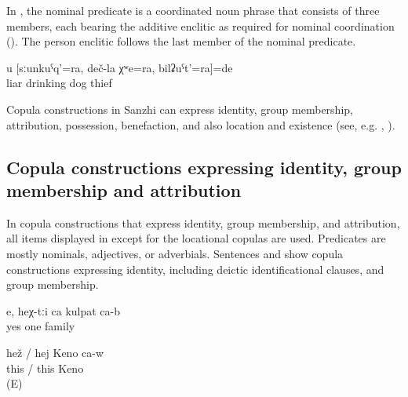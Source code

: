 In , the nominal predicate is a coordinated noun phrase that consists of three members, each bearing the additive enclitic as required for nominal coordination (). The person enclitic follows the last member of the nominal predicate.
%
\begin{exe}
	\ex	\label{ex:You are a liar, a drinking dog, and a thief}
	\gll	u	[sːunkuˁq'=ra,	deč-la	χʷe=ra,	bilʡuˁt'=ra]=de\\
			liar	drinking	dog	thief\\
	\glt	{}
\end{exe}

Copula constructions in Sanzhi can express identity, group membership, attribution, possession, benefaction, and also location and existence (see, e.g. \citealp{Curnow2000}, \citealp[159]{Dixon2010}). 

\subsection{Copula constructions expressing identity, group membership and attribution}
\label{ssec:Copula constructions expressing identity, group membership and attribution}

In copula constructions that express identity, group membership, and attribution, all items displayed in  except for the locational copulas are used. Predicates are mostly nominals, adjectives, or adverbials. Sentences  and  show copula constructions expressing identity, including deictic identificational clauses, and group membership. 
%
\begin{exe}
	\ex	\label{ex:Yes, they are one family}
	\gll	e,	heχ-tːi	ca	kulpat	ca-b\\
		yes		one	family		\\
	\glt	{}

	\ex	\label{ex:This is Zapir}
	\gll	hež	/	hej	Keno	ca-w\\
		this	/	this	Keno	\\
	\glt	{} (E)
\end{exe}

